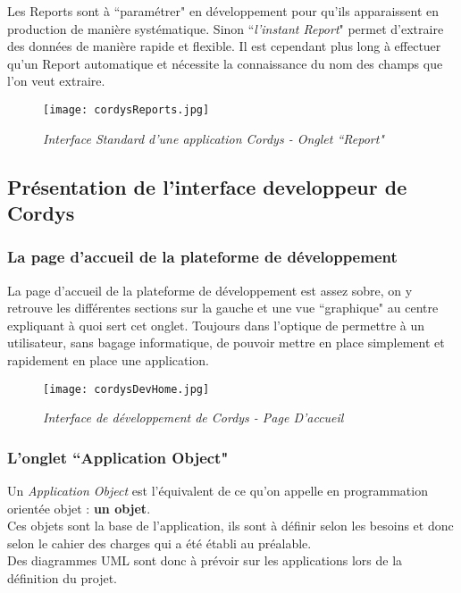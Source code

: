 Les Reports sont à ``paramétrer" en développement pour qu'ils apparaissent en production de manière systématique. Sinon ``\emph{l'instant Report}" permet d'extraire des données de manière rapide et flexible. Il est cependant plus long à effectuer qu'un Report automatique et nécessite la connaissance du nom des champs que l'on veut extraire.

 \begin{figure}[H]
    \centering
    \texttt{[image: cordysReports.jpg]}
	\caption{\textit{Interface Standard d'une application Cordys - Onglet ``Report"}}\label{image.CordysReports} 
\end{figure}

\clearpage

\subsection{Présentation de l'interface developpeur de Cordys}

\subsubsection{La page d'accueil de la plateforme de développement}

La page d'accueil de la plateforme de développement est assez sobre, on y retrouve les différentes sections sur la gauche et une vue ``graphique" au centre expliquant à quoi sert cet onglet. Toujours dans l'optique de permettre à un utilisateur, sans bagage informatique, de pouvoir mettre en place simplement et rapidement en place une application.

 \begin{figure}[H]
    \centering
    \texttt{[image: cordysDevHome.jpg]}
	\caption{\textit{Interface de développement de Cordys - Page D'accueil}}\label{image.CordysDevHome} 
\end{figure}

\subsubsection{L'onglet ``Application Object"}

Un \emph{Application Object} est l'équivalent de ce qu'on appelle en programmation orientée objet : \textbf{un objet}.\\
Ces objets sont la base de l'application, ils sont à définir selon les besoins et donc selon le cahier des charges qui a été établi au préalable.\\
Des diagrammes UML sont donc à prévoir sur les applications lors de la définition du projet.

